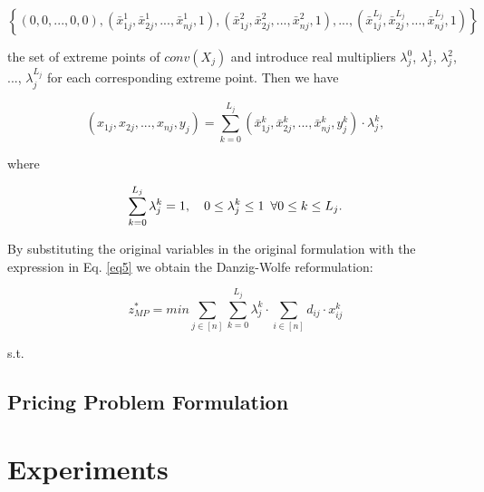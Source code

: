 \documentclass[
	11pt,
	DIV10,
	ngerman,
	a4paper,
	oneside,
	headings=normal,
	captions=tableheading,
	final,
	numbers=noenddot
]{scrartcl}
\begin{document}
\begin{equation}
	\left\{(0, 0, ..., 0, 0), (\bar{x}_{1j}^{1}, \bar{x}_{2j}^{1}, ..., \bar{x}_{nj}^{1}, 1), (\bar{x}_{1j}^{2}, \bar{x}_{2j}^{2}, ..., \bar{x}_{nj}^{2}, 1), ..., (\bar{x}_{1j}^{L_{j}}, \bar{x}_{2j}^{L_{j}}, ..., \bar{x}_{nj}^{L_{j}}, 1)\right\} \nonumber
\end{equation}

the set of extreme points of $ conv(X_{j}) $ and introduce real multipliers $ \lambda_{j}^{0} $, $ \lambda_{j}^{1} $, $ \lambda_{j}^{2} $, ..., $ \lambda_{j}^{L_{j}} $ for each corresponding extreme point. Then we have

\begin{equation}
	(x_{1j}, x_{2j}, ..., x_{nj}, y_{j}) = \sum_{k = 0}^{L_{j}} (\bar{x}_{1j}^{k}, \bar{x}_{2j}^{k}, ..., \bar{x}_{nj}^{k}, y_{j}^{k}) \cdot \lambda_{j}^{k},
\end{equation}

where

\begin{equation}
	\label{eq5}
	\sum_{k = 0}^{L_{j}} \lambda_{j}^{k} = 1, \quad 0 \leq \lambda_{j}^{k} \leq 1 \hspace{0.5em} \forall 0 \leq k \leq L_{j}.
\end{equation}

By substituting the original variables in the original formulation with the expression in Eq. \eqref{eq5} we obtain the Danzig-Wolfe reformulation:

\begin{equation}
	\label{eq6}
	z_{MP}^{*} = min \sum_{j \in [n]} \sum_{k = 0}^{L_{j}} \lambda_{j}^{k} \cdot \sum_{i \in [n]} d_{ij} \cdot x_{ij}^{k}
\end{equation}

s.t.


\subsection{Pricing Problem Formulation}



\section{Experiments}
\label{sec2}



\end{document}
